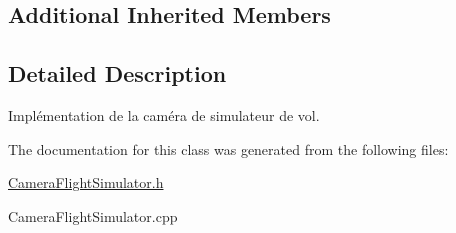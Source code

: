\subsection*{Additional Inherited Members}


\subsection{Detailed Description}
Implémentation de la caméra de simulateur de vol. 

The documentation for this class was generated from the following files\+:\begin{DoxyCompactItemize}
\item 
\hyperlink{CameraFlightSimulator_8h}{Camera\+Flight\+Simulator.\+h}\item 
Camera\+Flight\+Simulator.\+cpp\end{DoxyCompactItemize}
